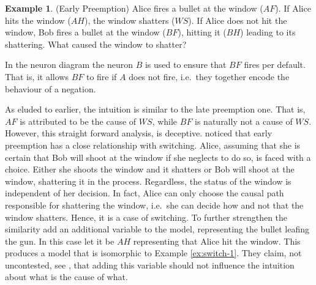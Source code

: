 \documentclass[11pt,a4paper]{book}
\theoremstyle{definition}
\theoremstyle{definition}
\newtheorem{example}{Example}[section]
\theoremstyle{definition}
\theoremstyle{remark}
\begin{document}
\begin{example}(Early Preemption)
\label{ex:early-preemption-1}
Alice fires a bullet at the window ($AF$). If Alice hits the window ($AH$), the window shatters ($WS$).
If Alice does not hit the window, Bob fires a bullet at the window ($BF$), hitting it ($BH$) leading to its shattering.
What caused the window to shatter?

In the neuron diagram the neuron $B$ is used to ensure that $BF$ fires per default. 
That is, it allows $BF$ to fire if $A$ does not fire, i.e.\ they together encode the behaviour of a negation.
\begin{center}
\end{center}
\end{example}

As eluded to earlier, the intuition is similar to the late preemption one. That is, $AF$ is attributed to be the cause of $WS$, while $BF$ is naturally not a cause of $WS$.
However, this straight forward analysis, is deceptive. \parencite{beckers2018principled} noticed that early preemption has a close relationship with switching.
Alice, assuming that she is certain that Bob will shoot at the window if she neglects to do so, is faced with a choice.
Either she shoots the window and it shatters or Bob will shoot at the window, shattering it in the process. Regardless, the status of the window is independent of her decision. 
In fact, Alice can only choose the causal path responsible for shattering the window, i.e.\ she can decide how and not that the window shatters.
Hence, it is a case of switching. To further strengthen the similarity \parencite{denecker2019explaining} add an additional variable to the model, representing the bullet leafing the gun. In this case let it be $AH$ representing that Alice hit the window. This produces a model that is isomorphic to Example \ref{ex:switch-1}. They claim, not uncontested, see \parencite{weslake2015partial}, that adding this variable should not influence the intuition about what is the cause of what.
\end{document}
